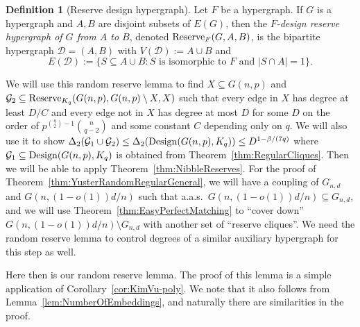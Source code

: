 \documentclass[11pt]{article}
\numberwithin{equation}{section}
\newcounter{i}
\theoremstyle{plain}
\theoremstyle{plain} %
\theoremstyle{definition}
\newtheorem{definition}[thm]{Definition}
\newcommand{\cG}{\mathcal{G}}
\newcommand{\aas}{a.a.s.\ }
\begin{document}
\begin{definition}[Reserve design hypergraph]\label{def:reserve-design}
Let $F$ be a hypergraph. If $G$ is a hypergraph and $A,B$ are disjoint subsets of $E(G)$, then the \emph{$F$-design reserve hypergraph of $G$ from $A$ to $B$}, denoted ${\rm Reserve}_F(G,A,B)$, %
is the bipartite hypergraph $\mathcal{D}=(A,B)$ with $V(\mathcal{D}):=A\cup B$ and $$E(\mathcal{D}) := \{S\subseteq A\cup B: S \text{ is isomorphic to } F \text{ and } |S\cap A|=1\}.$$
\end{definition}

We will use this random reserve lemma to find $X\subseteq G(n,p)$ and $\cG_2 \subseteq {\rm Reserve}_{K_q}(G(n,p), G(n,p)\setminus X, X)$ such that every edge in $X$ has degree at least $D / C$ and every edge not in $X$ has degree at most $D$ for some $D$ on the order of $p^{\binom{q}{2} - 1}\binom{n}{q - 2}$ and some constant $C$ depending only on $q$.
We will also use it to show $\Delta_2(\cG_1 \cup \cG_2) \leq \Delta_2({\rm Design}(G(n,p), K_q)) \leq D^{1 - \beta / (7q)}$ where $\cG_1 \subseteq {\rm Design}(G(n,p), K_q)$ is obtained from Theorem~\ref{thm:RegularCliques}.  Then we will be able to apply Theorem~\ref{thm:NibbleReserves}.
For the proof of Theorem~\ref{thm:YusterRandomRegularGeneral}, we will have a coupling of $G_{n,d}$ and $G(n, (1 - o(1))d/n)$ such that \aas $G(n, (1 - o(1))d/n) \subseteq G_{n,d}$, and we will use Theorem~\ref{thm:EasyPerfectMatching} to ``cover down'' $G(n, (1 - o(1))d/n) \setminus G_{n,d}$ with another set of ``reserve cliques''.  We need the random reserve lemma to control degrees of a similar auxiliary hypergraph for this step as well.

Here then is our random reserve lemma.
The proof of this lemma is a simple application of Corollary~\ref{cor:KimVu-poly}.  We note that it also follows from Lemma~\ref{lem:NumberOfEmbeddings}, and naturally there are similarities in the proof.
\end{document}
